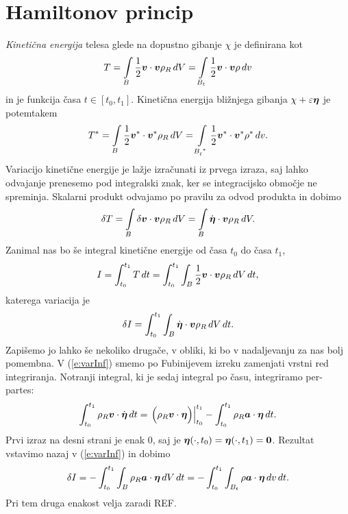\section{Hamiltonov princip}


\emph{Kinetična energija} telesa glede na dopustno gibanje $\chi$ je definirana kot
\begin{equation*}
	T = \int\limits_{B}\frac{1}{2}\boldsymbol v\cdot\boldsymbol v\rho_R\, dV =
	\int\limits_{B_t}\frac{1}{2}\boldsymbol v\cdot\boldsymbol v\rho\, dv
\end{equation*}
in je funkcija časa $t\in[t_0,t_1]$. Kinetična energija bližnjega gibanja $\chi+\varepsilon\boldsymbol \eta$
je potemtakem
\begin{equation*}
	T^* = \int\limits_{B}\frac{1}{2}\vek{v}^*\cdot\vek{v}^*\rho_R\, dV =
	\int\limits_{\bottop{B}{t}{*}}\frac{1}{2}\vek{v}^*\cdot\vek{v}^*\rho^*\, dv.
\end{equation*}
Variacijo kinetične energije je lažje izračunati iz prvega izraza, saj lahko odvajanje prenesemo pod
integralski znak, ker se integracijsko območje ne spreminja. Skalarni produkt odvajamo
po pravilu za odvod produkta in dobimo
\[
	\delta T =
	\int\limits_{B}\delta\boldsymbol v\cdot\boldsymbol v\rho_R\, dV=
	\int\limits_{B}\dot{\boldsymbol \eta}\cdot\boldsymbol v\rho_R\, dV.
\]
Zanimal nas bo še integral kinetične energije od časa $t_0$ do časa $t_1$,
\[ I=\int_{t_0}^{t_1} T\,dt=\int_{t_0}^{t_1} \int_{B}\frac{1}{2}\boldsymbol v\cdot\boldsymbol v\rho_R\, dV \,dt, \]
katerega variacija je
\begin{equation}\label{e:varInf}
	\delta I=\int_{t_0}^{t_1}\int_{B}\dot{\boldsymbol \eta}\cdot\boldsymbol v\rho_R\, dV\, dt.
\end{equation}
Zapišemo jo lahko še nekoliko drugače, v obliki, ki bo v nadaljevanju za nas bolj pomembna.
V (\ref{e:varInf}) smemo po Fubinijevem izreku zamenjati vrstni red integriranja.
Notranji integral, ki je sedaj integral po času, integriramo per-partes:
\[
	\int_{t_0}^{t_1}\rho_R\boldsymbol v\cdot\dot{\boldsymbol \eta}\, dt =
	\left.\Big(\rho_R\boldsymbol v\cdot\boldsymbol \eta\Big)\right|_{t_0}^{t_1}-
	\int_{t_0}^{t_1}\rho_R\boldsymbol a\cdot\boldsymbol \eta\,dt.
\]
Prvi izraz na desni strani je enak 0, saj je $\boldsymbol \eta(\cdot,t_0)=\boldsymbol \eta(\cdot,t_1)=\boldsymbol 0$.
Rezultat vstavimo nazaj v (\ref{e:varInf}) in dobimo
\begin{equation*}
	\delta I =
	-\int_{t_0}^{t_1}\int_{B}\rho_R\boldsymbol a\cdot\boldsymbol \eta\, dV\, dt=
	-\int_{t_0}^{t_1}\int_{B_t}\rho\boldsymbol a\cdot\boldsymbol \eta\, dv\, dt.
\end{equation*}
Pri tem druga enakost velja zaradi REF.

